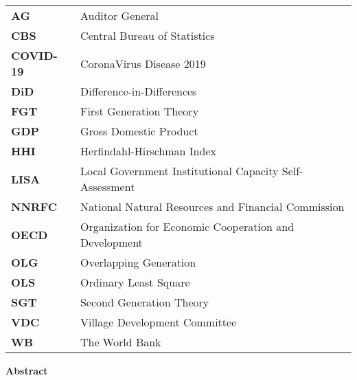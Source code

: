 \section*{}
\begin{tabular}{ll}
\textbf{AG} &Auditor General\\
\textbf{CBS} & Central Bureau of Statistics\\
\textbf{COVID-19} & CoronaVirus Disease 2019\\
\textbf{DiD} & Difference-in-Differences\\
\textbf{FGT} &First Generation Theory\\
\textbf{GDP} &  Gross Domestic Product\\
\textbf{HHI} & Herfindahl-Hirschman Index\\
\textbf{LISA} &Local Government Institutional Capacity Self-Assessment\\ 
\textbf{NNRFC}& National Natural Resources and Financial Commission\\
\textbf{OECD} &  Organization for Economic Cooperation and Development\\
\textbf{OLG}&Overlapping Generation\\
\textbf{OLS}& Ordinary Least Square\\
\textbf{SGT} & Second Generation Theory\\
\textbf{VDC} &  Village Development Committee\\
\textbf{WB} & The World Bank\\

\end{tabular}





\newpage
\begin{center}
\textbf{\large Abstract}
\end{center}
